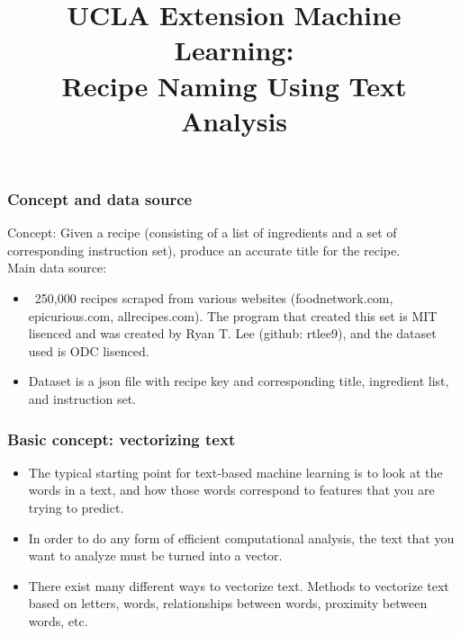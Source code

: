 \documentclass{beamer}
\title{UCLA Extension Machine Learning:\\
	Recipe Naming Using Text Analysis}
\begin{document}
\begin{frame}
\titlepage
\end{frame}


\begin{frame}
	\frametitle{Concept and data source}

	Concept: Given a recipe (consisting of a list of ingredients and a set
	of corresponding instruction set), produce an accurate title for the
	recipe.\\
	\medskip
	Main data source:
	\begin{itemize}
		\item ~250,000 recipes scraped from various websites
			(foodnetwork.com, epicurious.com, allrecipes.com). The
			program that created this set is MIT lisenced and was
			created by Ryan T. Lee (github: rtlee9), and the
			dataset used is ODC lisenced.
			
		\item Dataset is a json file with recipe key and corresponding
			title, ingredient list, and instruction set.
	\end{itemize}
\end{frame}
			

\begin{frame}
	\frametitle{Basic concept: vectorizing text}
	\begin{itemize}
		\item The typical starting point for text-based machine
			learning is to look at the words in a text, and how
			those words correspond to features that you are trying
			to predict.
		\item In order to do any form of efficient computational
			analysis, the text that you want to analyze must be
			turned into a vector. 
		\item There exist many different ways to vectorize text.
			Methods to vectorize text based on letters, words,
			relationships between words, proximity between words,
			etc.

	\end{itemize}
	\bigskip


	\noindent{}
\end{frame}
\end{document}
